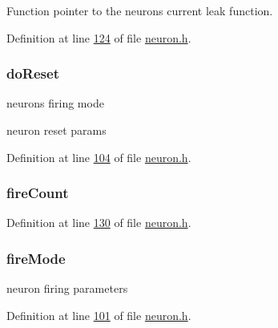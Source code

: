 Function pointer to the neuron\textquotesingle{}s current leak function. 



Definition at line \hyperlink{neuron_8h_source_l00124}{124} of file \hyperlink{neuron_8h_source}{neuron.\+h}.

\hypertarget{structneuron_state_afcf9d931e4fda519c43b4efeab687463}{}
\subsubsection[{do\+Reset}]{ do\+Reset}\label{structneuron_state_afcf9d931e4fda519c43b4efeab687463}


neuron\textquotesingle{}s firing mode 

neuron reset params 

Definition at line \hyperlink{neuron_8h_source_l00104}{104} of file \hyperlink{neuron_8h_source}{neuron.\+h}.

\hypertarget{structneuron_state_afe8825076c4cf3863c677307fec63c61}{}
\subsubsection[{fire\+Count}]{ fire\+Count}\label{structneuron_state_afe8825076c4cf3863c677307fec63c61}


Definition at line \hyperlink{neuron_8h_source_l00130}{130} of file \hyperlink{neuron_8h_source}{neuron.\+h}.

\hypertarget{structneuron_state_a55890f9e021064df30e9d18a9df98845}{}
\subsubsection[{fire\+Mode}]{ fire\+Mode}\label{structneuron_state_a55890f9e021064df30e9d18a9df98845}


neuron firing parameters 



Definition at line \hyperlink{neuron_8h_source_l00101}{101} of file \hyperlink{neuron_8h_source}{neuron.\+h}.

